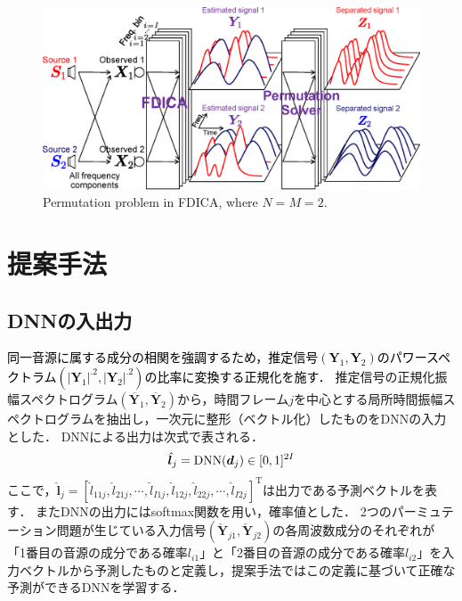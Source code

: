 \documentclass[a4j]{jsarticle}
\newcommand{\red}[1]{\textcolor{black}{#1}}
\begin{document}
\begin{figure}[t]
  \begin{center}
      \includegraphics[width=0.95\columnwidth]{figures/permutation_image.eps}
  \end{center}
  \vspace{-8pt}
\caption{Permutation problem in FDICA, where $N=M=2$.}
\label{fig:permu}
\end{figure}

\section{提案手法}

\subsection{DNNの入出力}
\red{同一音源に属する成分の相関を強調するため，推定信号$(\bm{Y}_1, \bm{Y}_2)$のパワースペクトラム$(|\bm{Y}_1|^{.2}, |\bm{Y}_2|^{.2})$の比率に変換する正規化\cite{Permutation_solverBSS}を施す．}
推定信号の正規化振幅スペクトログラム$(\overline{\bm{Y}}_1, \overline{\bm{Y}}_2)$から，時間フレーム$j$を中心とする局所時間振幅スペクトログラムを抽出し，一次元に整形（ベクトル化）したものをDNNの入力とした．
DNNによる出力は次式で表される．
\begin{align}
    \red{\hat{\bm{l}}_j = \mathrm{DNN}(\bm{d}_j) \in [ 0, 1 ]^{2I}}
\end{align}
ここで，$\hat{\bm{l}}_j = [ \hat{l}_{11j}, \hat{l}_{21j}, \cdots, \hat{l}_{I1j}, \hat{l}_{12j}, \hat{l}_{22j}, \cdots, \hat{l}_{I2j} ]^\mathrm{T}$は出力である予測ベクトルを表す．
またDNNの出力にはsoftmax関数を用い，確率値とした．
2つのパーミュテーション問題が生じている入力信号$(\check{\bm{Y}}_{j1}, \check{\bm{Y}}_{j2})$の各周波数成分のそれぞれが
「1番目の音源の成分である確率$l_{i1}$」と「2番目の音源の成分である確率$l_{i2}$」を入力ベクトルから予測したものと定義し，提案手法ではこの定義に基づいて正確な予測ができるDNNを学習する．
\end{document}
